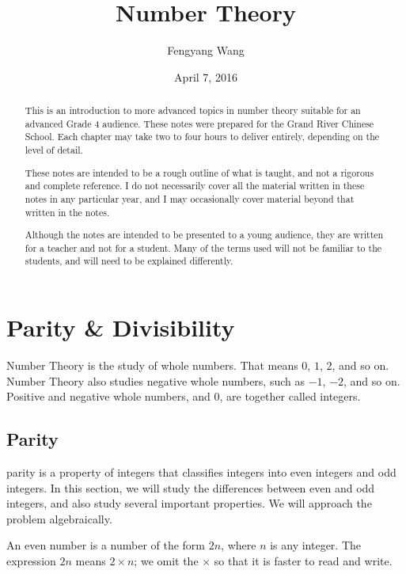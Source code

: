 \documentclass[a4paper,10pt]{report}
\title{Number Theory}
\author{Fengyang Wang}
\date{April 7, 2016}
\begin{document}
\begin{abstract}

 This is an introduction to more advanced topics in number theory suitable for
 an advanced Grade 4 audience. These notes were prepared for the Grand River
 Chinese School. Each chapter may take two to four hours to deliver entirely,
 depending on the level of detail.

 These notes are intended to be a rough outline of what is taught, and not a
 rigorous and complete reference. I do not necessarily cover all the material
 written in these notes in any particular year, and I may occasionally cover
 material beyond that written in the notes.

 Although the notes are intended to be presented to a young audience, they are
 written for a teacher and not for a student. Many of the terms used will not be
 familiar to the students, and will need to be explained differently.

\end{abstract}

\maketitle

\tableofcontents

\chapter{Parity \& Divisibility}

Number Theory is the study of whole numbers. That means $0$, $1$, $2$, and so
on. Number Theory also studies negative whole numbers, such as $-1$, $-2$, and
so on. Positive and negative whole numbers, and $0$, are together called
\glspl{integer}.

\section{Parity}

\Gls{parity} is a property of integers that classifies integers into even
integers and odd integers. In this section, we will study the differences
between even and odd integers, and also study several important properties. We
will approach the problem algebraically.

An even number is a number of the form $2n$, where $n$ is any integer. The
expression $2n$ means $2\times n$; we omit the $\times$ so that it is faster to
read and write.
\end{document}
